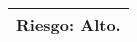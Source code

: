 \begin{longtable}{|l|l|}
\multicolumn{2}{|l|}{Riesgo: Alto.}                                                                                                                                                                                                                                                                                                                                                                                                                                                                    \\ \hline
\end{longtable}